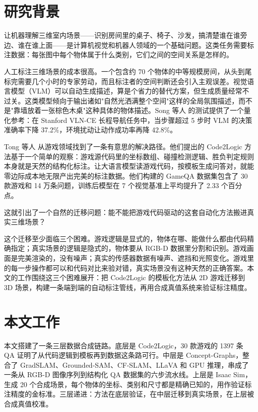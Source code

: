 
\section{研究背景}

让机器理解三维室内场景——识别房间里的桌子、椅子、沙发，搞清楚谁在谁旁边、谁在谁上面——是计算机视觉和机器人领域的一个基础问题。这类任务需要标注数据：每张图中每个物体属于什么类别，它们之间的空间关系是怎样的。

人工标注三维场景的成本很高。一个包含约 70 个物体的中等规模房间，从头到尾标完需要几个小时的专家劳动，而且标注者的空间判断还会引入主观误差。视觉语言模型（VLM）可以自动生成描述，算是个省力的替代方案，但生成质量经常不过关。这类模型倾向于输出诸如"自然光洒满整个空间"这样的全局氛围描述，而不是"靠墙放着一张棕色木桌"这种具体的物体描述。Song 等人\cite{llm_planner} 的测试提供了一个量化参考：在 Stanford VLN-CE 长程导航任务中，当步骤超过 5 步时 VLM 的决策准确率下降 37.2\%，环境扰动让动作成功率再降 42.8\%。

Tong 等人\cite{code2logic} 从游戏领域找到了一条有意思的解决路径。他们提出的 Code2Logic 方法基于一个简单的观察：游戏源代码里的坐标数组、碰撞检测逻辑、胜负判定规则本身就是天然的结构化标注。让大语言模型读游戏代码，按模板生成问答对，就能零边际成本地无限产出完美的标注数据。他们构建的 GameQA 数据集包含了 30 款游戏和 14 万条问题，训练后模型在 7 个视觉基准上平均提升了 2.33 个百分点。

这就引出了一个自然的迁移问题：能不能把游戏代码驱动的这套自动化方法搬进真实三维场景？

这个迁移至少面临三个困难。游戏逻辑是显式的，物体在哪、能做什么都由代码精确指定；真实场景的逻辑是隐式的，物体要从 RGB-D 数据里分割和识别。游戏画面是完美渲染的，没有噪声；真实的传感器数据有噪声、遮挡和光照变化。游戏里的每一步操作都可以和代码对比来验对错，真实场景没有这种天然的正确答案。本文的工作围绕这三个困难展开：把 Code2Logic 的模板化方法从 2D 游戏迁移到 3D 场景，构建一条端到端的自动标注管线，再用合成真值系统来验证标注精度。

\section{本文工作}

本文搭建了一条三层数据合成链路。底层是 Code2Logic，30 款游戏的 1397 条 QA 证明了从代码逻辑到模板再到数据这条路可行。中层是 Concept-Graphs，整合了 GradSLAM、Grounded-SAM、CF-SLAM、LLaVA 和 GPU 推理，串成了一条从 RGB-D 图像序列到结构化 QA 数据集的六步流水线。上层是 Isaac Sim，生成 20 个合成场景，每个物体的坐标、类别和尺寸都是精确已知的，用作验证标注精度的金标准。三层递进：方法在底层验证，在中层迁移到真实场景，在上层被合成真值校准。


